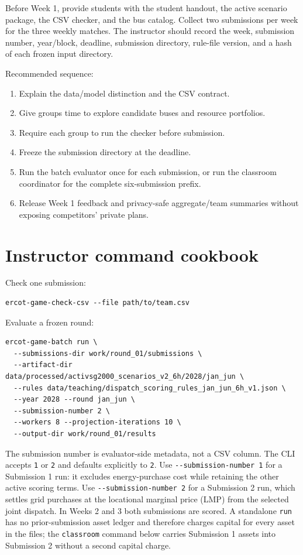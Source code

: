\documentclass[12pt]{article}
\newcommand{\code}[1]{\texttt{#1}}
\newcommand{\clioption}[1]{\lstinline|#1|}
\begin{document}
Before Week 1, provide students with the student handout, the active scenario
package, the CSV checker, and the bus catalog. Collect two submissions per week
for the three weekly matches. The instructor should record the week, submission
number, year/block, deadline, submission directory, rule-file version, and a
hash of each frozen input directory.

Recommended sequence:
\begin{enumerate}[leftmargin=*]
  \item Explain the data/model distinction and the CSV contract.
  \item Give groups time to explore candidate buses and resource portfolios.
  \item Require each group to run the checker before submission.
  \item Freeze the submission directory at the deadline.
  \item Run the batch evaluator once for each submission, or run the classroom
  coordinator for the complete six-submission prefix.
  \item Release Week 1 feedback and privacy-safe aggregate/team summaries
  without exposing competitors' private plans.
\end{enumerate}

\section{Instructor command cookbook}

Check one submission:
\begin{lstlisting}
ercot-game-check-csv --file path/to/team.csv
\end{lstlisting}

Evaluate a frozen round:
\begin{lstlisting}
ercot-game-batch run \
  --submissions-dir work/round_01/submissions \
  --artifact-dir data/processed/activsg2000_scenarios_v2_6h/2028/jan_jun \
  --rules data/teaching/dispatch_scoring_rules_jan_jun_6h_v1.json \
  --year 2028 --round jan_jun \
  --submission-number 2 \
  --workers 8 --projection-iterations 10 \
  --output-dir work/round_01/results
\end{lstlisting}

The submission number is evaluator-side metadata, not a CSV column. The CLI
accepts \code{1} or \code{2} and defaults explicitly to \code{2}. Use
\clioption{--submission-number 1} for a Submission 1 run: it excludes
energy-purchase cost while retaining the other active scoring terms. Use
\clioption{--submission-number 2} for a Submission 2 run, which settles grid
purchases at the locational marginal price (LMP) from the selected joint
dispatch. In Weeks 2 and 3 both submissions are scored. A standalone
\code{run} has no prior-submission asset ledger and therefore charges capital
for every asset in the files; the \code{classroom} command below carries
Submission 1 assets into Submission 2 without a second capital charge.
\end{document}
